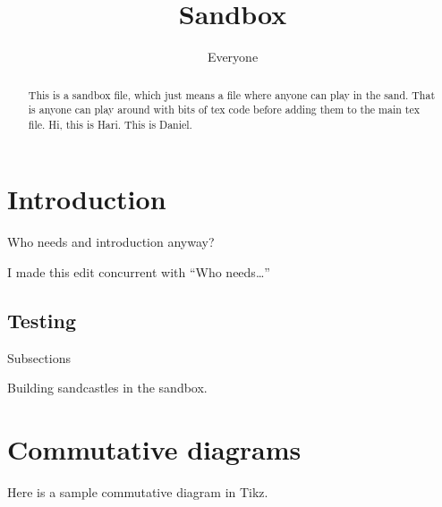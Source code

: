 \documentclass{article}
\title{Sandbox}
\author{Everyone}
\begin{document}
\maketitle

\begin{abstract}
    This is a sandbox file, which just means a file where anyone can
    play in the sand. That is anyone can play around with bits of tex
    code before adding them to the main tex file. Hi, this is
    Hari. This is Daniel.
\end{abstract}

\section{Introduction}

Who needs and introduction anyway?

I made this edit concurrent with ``Who needs\ldots''

\subsection{Testing}

Subsections

Building sandcastles in the sandbox.



\section{Commutative diagrams}
Here is a sample commutative diagram in Tikz. 
\begin{center}
\end{center}
\end{document}
